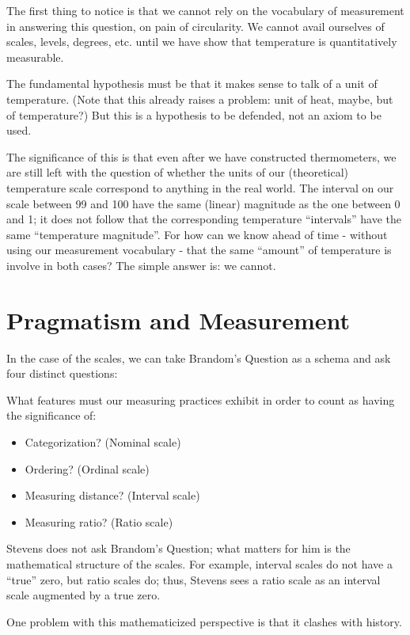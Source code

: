 \documentclass[11pt,twoside]{article}
\begin{document}
The first thing to notice is that we cannot rely on the vocabulary of
measurement in answering this question, on pain of circularity.  We
cannot avail ourselves of scales, levels, degrees, etc. until we have
show that temperature is quantitatively measurable.

The fundamental hypothesis must be that it makes sense to talk of a
unit of temperature.  (Note that this already raises a problem: unit
of heat, maybe, but of temperature?)  But this is a hypothesis to be
defended, not an axiom to be used.

The significance of this is that even after we have constructed
thermometers, we are still left with the question of whether the units
of our (theoretical) temperature scale correspond to anything in the
real world.  The interval on our scale between 99 and 100 have the
same (linear) magnitude as the one between 0 and 1; it does not follow
that the corresponding temperature ``intervals'' have the same
``temperature magnitude''.  For how can we know ahead of time -
without using our measurement vocabulary - that the same ``amount'' of
temperature is involve in both cases?  The simple answer is: we cannot.

\clearpage
\section{Pragmatism and Measurement}

In the case of the scales, we can take Brandom's Question as a schema
and ask four distinct questions:

What features must our measuring practices exhibit in order to count
as having the significance of:

\begin{itemize}
\item Categorization? (Nominal scale)
\item Ordering?  (Ordinal scale)
\item Measuring distance? (Interval scale)
\item Measuring ratio? (Ratio scale)
\end{itemize}

Stevens does not ask Brandom's Question; what matters for him is the
mathematical structure of the scales.  For example, interval scales do
not have a ``true'' zero, but ratio scales do; thus, Stevens sees
a ratio scale as an interval scale augmented by a true zero.

One problem with this mathematicized perspective is that it clashes
with history.
\end{document}
